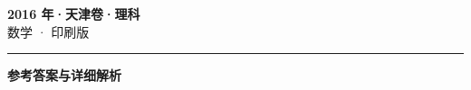 \documentclass[zihao=5, a4paper]{ctexart}
\begin{document}
\begin{center}
  {\Large\bfseries 2016 年·天津卷·理科}\\[4pt]
  {\large 数学 · 印刷版}
\end{center}
\medskip
{}

\par\bigskip\hrule\bigskip
{}
\begin{center}{\large\bfseries 参考答案与详细解析}\end{center}
\smallskip

\end{document}
